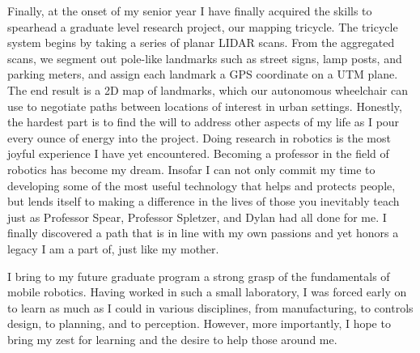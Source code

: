 \documentclass[10pt]{article}
\begin{document}
Finally, at the onset of my senior year I have finally acquired the skills to
spearhead a graduate level research project, our mapping tricycle. The tricycle
system begins by taking a series of planar LIDAR scans. From the aggregated
scans, we segment out pole-like landmarks such as street signs, lamp posts, and
parking meters, and assign each landmark a GPS coordinate on a UTM plane.  The
end result is a 2D map of landmarks, which our autonomous wheelchair can use to
negotiate paths between locations of interest in urban settings. Honestly, the
hardest part is to find the will to address other aspects of my life as I pour
every ounce of energy into the project. Doing research in robotics is the most
joyful experience I have yet encountered. Becoming a professor in the field of
robotics has become my dream. Insofar I can not only commit my time to
developing some of the most useful technology that helps and protects people,
but lends itself to making a difference in the lives of those you inevitably
teach just as Professor Spear, Professor Spletzer, and Dylan had all done for
me. I finally discovered a path that is in line with my own passions and yet
honors a legacy I am a part of, just like my mother.

I bring to my future graduate program a strong grasp of the fundamentals of
mobile robotics. Having worked in such a small laboratory, I was forced early
on to learn as much as I could in various disciplines, from manufacturing, to
controls design, to planning, and to perception. However, more importantly, I
hope to bring my zest for learning and the desire to help those around me. 
\end{document}
